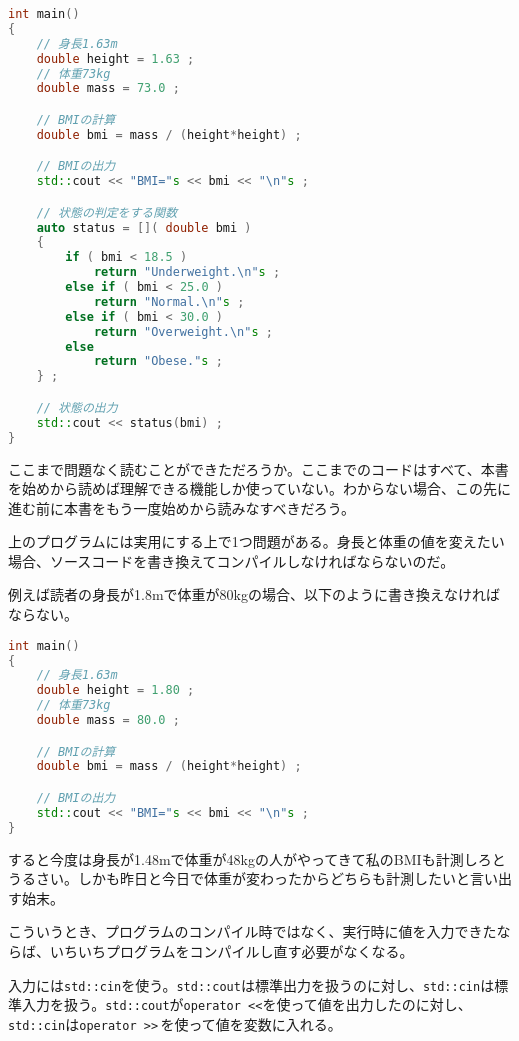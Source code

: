 \begin{lstlisting}[language={C++}]
int main()
{
    // 身長1.63m
    double height = 1.63 ;
    // 体重73kg
    double mass = 73.0 ;

    // BMIの計算
    double bmi = mass / (height*height) ;

    // BMIの出力
    std::cout << "BMI="s << bmi << "\n"s ;

    // 状態の判定をする関数
    auto status = []( double bmi )
    {
        if ( bmi < 18.5 )
            return "Underweight.\n"s ;
        else if ( bmi < 25.0 )
            return "Normal.\n"s ;
        else if ( bmi < 30.0 )
            return "Overweight.\n"s ;
        else
            return "Obese."s ;
    } ;

    // 状態の出力
    std::cout << status(bmi) ;
}
\end{lstlisting}

ここまで問題なく読むことができただろうか。ここまでのコードはすべて、本書を始めから読めば理解できる機能しか使っていない。わからない場合、この先に進む前に本書をもう一度始めから読みなすべきだろう。


上のプログラムには実用にする上で1つ問題がある。身長と体重の値を変えたい場合、ソースコードを書き換えてコンパイルしなければならないのだ。

例えば読者の身長が1.8mで体重が80kgの場合、以下のように書き換えなければならない。

\begin{lstlisting}[language={C++}]
int main()
{
    // 身長1.63m
    double height = 1.80 ;
    // 体重73kg
    double mass = 80.0 ;

    // BMIの計算
    double bmi = mass / (height*height) ;

    // BMIの出力
    std::cout << "BMI="s << bmi << "\n"s ;
}
\end{lstlisting}

すると今度は身長が1.48mで体重が48kgの人がやってきて私のBMIも計測しろとうるさい。しかも昨日と今日で体重が変わったからどちらも計測したいと言い出す始末。

こういうとき、プログラムのコンパイル時ではなく、実行時に値を入力できたならば、いちいちプログラムをコンパイルし直す必要がなくなる。

入力には\texttt{std::cin}を使う。\texttt{std::cout}は標準出力を扱うのに対し、\texttt{std::cin}は標準入力を扱う。\texttt{std::cout}が\texttt{operator {<}{<}}を使って値を出力したのに対し、\texttt{std::cin}は\texttt{operator {>}{>}}\,を使って値を変数に入れる。

